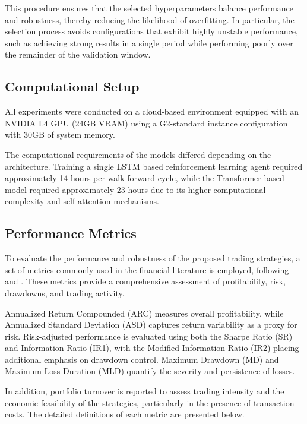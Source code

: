 \documentclass[]{elsarticle}
\begin{document}
This procedure ensures that the selected hyperparameters balance performance and robustness, thereby reducing the likelihood of overfitting. In particular, the selection process avoids configurations that exhibit highly unstable performance, such as achieving strong results in a single period while performing poorly over the remainder of the validation window.

\hypertarget{Computational-Setup}{%
\subsection{Computational Setup}\label{Computational-Setup}}

All experiments were conducted on a cloud-based environment equipped with an NVIDIA L4 GPU (24GB VRAM) using a G2-standard instance configuration with 30GB of system memory. 

The computational requirements of the models differed depending on the architecture. Training a single LSTM based reinforcement learning agent required approximately 14 hours per walk-forward cycle, while the Transformer based model required approximately 23 hours due to its higher computational complexity and self attention mechanisms.

\hypertarget{performance-metrics}{%
\subsection{Performance Metrics}\label{performance-metrics}}

To evaluate the performance and robustness of the proposed trading strategies, a set of metrics commonly used in the financial literature is employed, following \citet{michankow2022lstm} and \citet{PairTrading}. These metrics provide a comprehensive assessment of profitability, risk, drawdowns, and trading activity.

Annualized Return Compounded (ARC) measures overall profitability, while Annualized Standard Deviation (ASD) captures return variability as a proxy for risk. Risk-adjusted performance is evaluated using both the Sharpe Ratio (SR) and Information Ratio (IR1), with the Modified Information Ratio (IR2) placing additional emphasis on drawdown control. Maximum Drawdown (MD) and Maximum Loss Duration (MLD) quantify the severity and persistence of losses. 

In addition, portfolio turnover is reported to assess trading intensity and the economic feasibility of the strategies, particularly in the presence of transaction costs. The detailed definitions of each metric are presented below.
\end{document}
